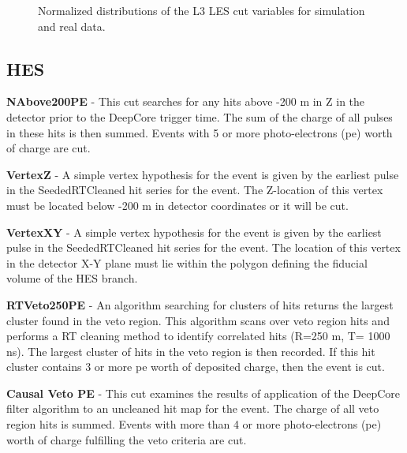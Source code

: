 \documentclass{gatech-thesis}
\begin{document}
\begin{figure}
\caption[L3 LES Cut Distributions]{Normalized distributions of the L3 LES cut variables for simulation and real data.} 
\label{fig:LES_L3_Plots}
\end{figure}

\subsection{HES}
\begin{adjustwidth}{1.5em}{1.5em}
\setlength{\parindent}{0pt}
\textbf{NAbove200PE} - This cut searches for any hits above -200 m in Z in the detector prior to the DeepCore trigger time. The sum of the charge of all pulses in these hits is then summed. Events with 5 or more photo-electrons (pe) worth of charge are cut.

\textbf{VertexZ} - A simple vertex hypothesis for the event is given by the earliest pulse in the SeededRTCleaned hit series for the event. The Z-location of this vertex must be located below -200 m in detector coordinates or it will be cut. 

\textbf{VertexXY} - A simple vertex hypothesis for the event is given by the earliest pulse in the SeededRTCleaned hit series for the event. The location of this vertex in the detector X-Y plane must lie within the polygon defining the fiducial volume of the HES branch. 

\textbf{RTVeto250PE} - An algorithm searching for clusters of hits returns the largest cluster found in the veto region. This algorithm scans over veto region hits and performs a RT cleaning method to identify correlated hits (R=250 m, T= 1000 ns). The largest cluster of hits in the veto region is then recorded. If this hit cluster contains 3 or more pe worth of deposited charge, then the event is cut.

\textbf{Causal Veto PE} - This cut examines the results of application of the DeepCore filter algorithm to an uncleaned hit map for the event. The charge of all veto region hits is summed. Events with more than 4 or more photo-electrons (pe) worth of charge fulfilling the veto criteria are cut.
\end{adjustwidth}
\setlength{\parindent}{17.5pt}
\end{document}
